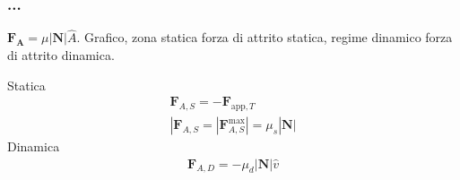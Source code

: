 \subsubsection*{...}
$\mathbf{F_A} = \mu|\mathbf{N}|\hat{A}$. Grafico, zona statica
forza di attrito statica, regime dinamico forza di attrito dinamica.

Statica
\begin{align}
    \mathbf{F}_{A,S} = -\mathbf{F}_{\text{app}, T}\\
    |\mathbf{F}_{A,S} = |\mathbf{F}_{A,S}^\text{max}| = \mu_s|\mathbf{N}|
\end{align}
Dinamica
\begin{align}
    \mathbf{F}_{A,D} = -\mu_d|\mathbf{N}|\hat{v}
\end{align}